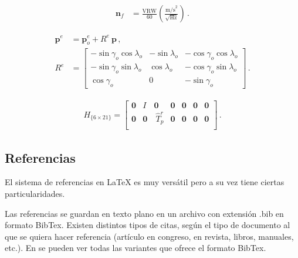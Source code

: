 \documentclass{article}
\begin{document}
\begin{align} \label{eq:vrw}
	{\boldsymbol n}_f &= \frac{ \text{VRW} }{60} \left ( \frac{\text{m/s}^2}{\sqrt{\text{Hz}}} \right ) \, .		 
\end{align}

\begin{subequations}  \label{ned2ecef}
	\begin{align}
		\label{eq:pe}{\boldsymbol p}^e &= {\boldsymbol p}^e_{o} + R^e ~ {\boldsymbol p}  \, , \\
		R^e &= 
		\begin{bmatrix}
			-\sin {\gamma_o} \cos {\lambda_o} & -\sin \lambda_o & -\cos \gamma_o \cos \lambda_o \\
			-\sin {\gamma_o} \sin {\lambda_o} &  \cos \lambda_o & -\cos \gamma_o \sin \lambda_o \\
			 \cos {\gamma_o}		  & 0	            & -\sin \gamma_o 
		\end{bmatrix} \, .
	\end{align}
\end{subequations}

\begin{align} 
\label{eq:h-matrix} H_{\{6\times21\}} =
\begin{bmatrix}
        \boldsymbol{0} & I  & \boldsymbol{0} &\boldsymbol{0}& \boldsymbol{0} &\boldsymbol{0}& \boldsymbol{0} \\
        \boldsymbol{0} & \boldsymbol{0} & ~\hat T_p^r  &\boldsymbol{0}& \boldsymbol{0} &\boldsymbol{0}& \boldsymbol{0}\\
  \end{bmatrix} \, .
\end{align} 

\subsection{Referencias} \label{sec:referencias}

El sistema de referencias en \LaTeX{} es muy versátil pero a su vez tiene ciertas particularidades.

Las referencias se guardan en texto plano en un archivo con extensión .bib en formato BibTex. Existen distintos tipos de citas, según el tipo de documento al que se quiera hacer referencia (artículo en congreso, en revista, libros, manuales, etc.). En \cite{BibtexExamples2019} se pueden ver todas las variantes que ofrece el formato BibTex.
\end{document}
